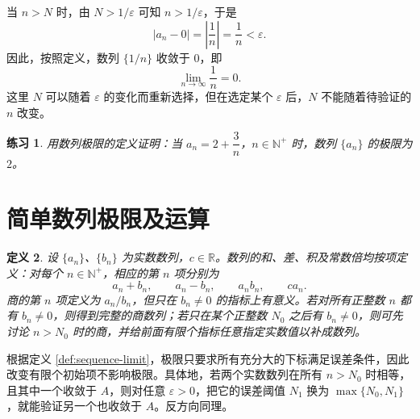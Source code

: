 \documentclass[UTF8,fontset=fandol,11pt]{ctexart}
\newtheorem{definition}{定义}[section]
\newtheorem{exercise}[definition]{练习}
\begin{document}
当 $n>N$ 时，由 $N>1/\varepsilon$ 可知 $n>1/\varepsilon$，于是
\[
\left|a_n-0\right|=\left|\frac{1}{n}\right|=\frac{1}{n}<\varepsilon.
\]
因此，按照定义，数列 $\{1/n\}$ 收敛于 $0$，即
\begin{equation}
\lim_{n\to\infty}\frac{1}{n}=0.
\label{eq:reciprocal-limit}
\end{equation}
这里 $N$ 可以随着 $\varepsilon$ 的变化而重新选择，但在选定某个 $\varepsilon$ 后，$N$ 不能随着待验证的 $n$ 改变。\par
\begin{exercise}
用数列极限的定义证明：当 $a_n=2+\dfrac{3}{n}$，$n\in\mathbb{N}^+$ 时，数列 $\{a_n\}$ 的极限为 $2$。
\end{exercise}
\section{简单数列极限及运算}\label{sec:S02}
\begin{definition}
设 $\{a_n\}$、$\{b_n\}$ 为实数数列，$c\in\mathbb{R}$。数列的和、差、积及常数倍均按项定义：对每个 $n\in\mathbb{N}^+$，相应的第 $n$ 项分别为
\[
a_n+b_n,\qquad a_n-b_n,\qquad a_nb_n,\qquad ca_n.
\]
商的第 $n$ 项定义为 $a_n/b_n$，但只在 $b_n\ne0$ 的指标上有意义。若对所有正整数 $n$ 都有 $b_n\ne0$，则得到完整的商数列；若只在某个正整数 $N_0$ 之后有 $b_n\ne0$，则可先讨论 $n>N_0$ 时的商，并给前面有限个指标任意指定实数值以补成数列。
\end{definition}
根据定义 \ref{def:sequence-limit}，极限只要求所有充分大的下标满足误差条件，因此改变有限个初始项不影响极限。具体地，若两个实数数列在所有 $n>N_0$ 时相等，且其中一个收敛于 $A$，则对任意 $\varepsilon>0$，把它的误差阈值 $N_1$ 换为 $\max\{N_0,N_1\}$，就能验证另一个也收敛于 $A$。反方向同理。
\end{document}
